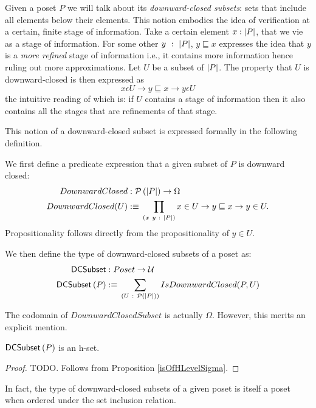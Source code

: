 Given a poset $P$ we will talk about its \emph{downward-closed subsets}: sets that include
all elements below their elements. This notion embodies the idea of verification at a
certain, finite stage of information. Take a certain element $x : \left| P \right|$, that we vie as
a stage of information. For some other $y~:~\left| P \right|$, $y \sqsubseteq x$ expresses the idea that $y$
is a \emph{more refined} stage of information i.e., it contains more information hence
ruling out more approximations. Let $U$ be a subset of $\left| P \right|$. The property that $U$
is downward-closed is then expressed as
\begin{equation*}
  x \epsilon U \rightarrow y \sqsubseteq x \rightarrow y \epsilon U
\end{equation*}
the intuitive reading of which is: if $U$ contains a stage of information then it also
contains all the stages that are refinements of that stage.

This notion of a downward-closed subset is expressed formally in the following
definition.
\begin{defn}
  We first define a predicate expression that a given subset of $P$ is downward closed:
  \begin{align*}
    DownwardClosed    &:  \mathcal{P}\left(\left| P \right|\right) \rightarrow \Omega\\
    DownwardClosed(U) &:\equiv{} \prod_{(x~y~:~\left| P \right|)} x \in U \rightarrow y \sqsubseteq x \rightarrow y \in U.
  \end{align*}
  Propositionality follows directly from the propositionality of $y \in U$.

  We then define the type of downward-closed subsets of a poset as:
  \begin{align*}
    \mathsf{DCSubset}{} &: Poset \rightarrow  \mathcal{U}\\
    \mathsf{DCSubset}{}\left(P\right)  &:\equiv{} \sum_{(U~:~\mathcal{P}\left(\left| P \right|\right))} IsDownwardClosed(P, U)
  \end{align*}
\end{defn}

The codomain of $DownwardClosedSubset$ is actually $\Omega$. However, this merits an explicit
mention.

\begin{prop}\label{isSetDCSubset}
  $\mathsf{DCSubset}{}\left(P\right)$ is an h-set.
\end{prop}
\begin{proof}
  TODO.
  Follows from Proposition \ref{isOfHLevelSigma}.
\end{proof}

In fact, the type of downward-closed subsets of a given poset is itself a poset
when ordered under the set inclusion relation.

